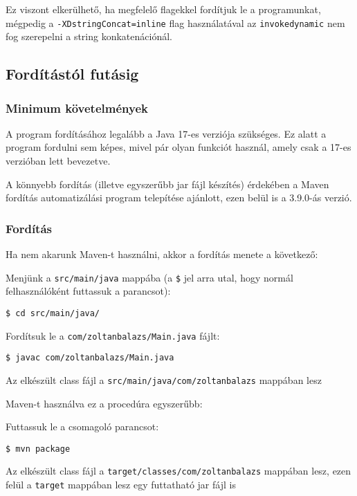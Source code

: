 Ez viszont elkerülhető, ha megfelelő flagekkel fordítjuk le a programunkat, mégpedig a \lstinline{-XDstringConcat=inline} flag használatával az \lstinline{invokedynamic} nem fog szerepelni a string konkatenációnál.

\subsection{Fordítástól futásig}

\subsubsection{Minimum követelmények}

A program fordításához legalább a Java 17-es verziója szükséges. Ez alatt a program fordulni sem képes, mivel pár olyan funkciót használ, amely csak a 17-es verzióban lett bevezetve.

A könnyebb fordítás (illetve egyszerűbb jar fájl készítés) érdekében a Maven fordítás automatizálási program telepítése ajánlott, ezen belül is a 3.9.0-ás verzió.

\subsubsection{Fordítás}

Ha nem akarunk Maven-t használni, akkor a fordítás menete a következő:
\begin{compactitem}
	\item Menjünk a \lstinline{src/main/java} mappába (a \lstinline{$} jel arra utal, hogy normál felhasználóként futtassuk a parancsot): 
	\begin{verbatim}
$ cd src/main/java/
	\end{verbatim}
	\item Fordítsuk le a \lstinline{com/zoltanbalazs/Main.java} fájlt:
	\begin{verbatim}
$ javac com/zoltanbalazs/Main.java
	\end{verbatim}
	\item Az elkészült class fájl a \lstinline{src/main/java/com/zoltanbalazs} mappában lesz 
\end{compactitem}

Maven-t használva ez a procedúra egyszerűbb:
\begin{compactitem}
	\item Futtassuk le a csomagoló parancsot:
	\begin{verbatim}
$ mvn package
	\end{verbatim}
	\item Az elkészült class fájl a \lstinline{target/classes/com/zoltanbalazs} mappában lesz, ezen felül a \lstinline{target} mappában lesz egy futtatható jar fájl is
\end{compactitem}

